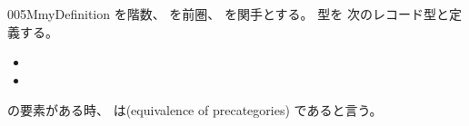 \documentclass[index]{subfiles}
\begin{document}
\begin{myBlock}{005M}{myDefinition}
  を階数、
  を前圏、
  を関手とする。
  型を
  次のレコード型と定義する。
  \begin{itemize}
  \item {}
  \item {}
  \end{itemize}
  の要素がある時、
  は(equivalence of precategories)
  であると言う。
\end{myBlock}
\end{document}
